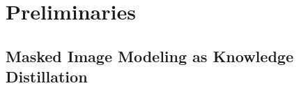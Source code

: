 \documentclass{article} %
\def\ourmethod{{iBOT}\xspace}
\begin{document}

\section{Preliminaries}

\subsection{Masked Image Modeling as Knowledge Distillation}
\end{document}
